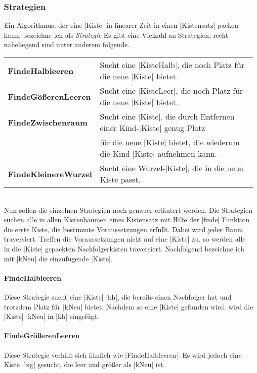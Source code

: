 \subsubsection{Strategien}
\label{strats}
 Ein Algorithmus, der eine |Kiste| in linearer Zeit in einen |Kistensatz| packen kann, bezeichne ich als \emph{Strategie}
 Es gibt eine Vielzahl an Strategien, recht naheliegend sind unter anderem folgende.\\

\begin{tabular}{ll}
 \textbf{FindeHalbleeren}    & Sucht eine |KisteHalb|, die noch Platz für die neue |Kiste| bietet. \\
 \textbf{FindeGößerenLeeren} & Sucht eine |KisteLeer|, die noch Platz für die neue |Kiste| bietet. \\
 \textbf{FindeZwischenraum}  & Sucht eine |Kiste|, die durch Entfernen einer Kind-|Kiste| genug Platz \\
                             & \hfill für die neue |Kiste| bietet, die wiederum die Kind-|Kiste| aufnehmen kann. \\
 \textbf{FindeKleinereWurzel}& Sucht eine Wurzel-|Kiste|, die in die neue Kiste passt.      \\
\end{tabular}\\

 Nun sollen die einzelnen Strategien noch genauer erläutert werden.
 Die Strategien suchen alle in allen Kistenbäumen eines Kistensatz mit Hilfe der |finde| Funktion die erste Kiste,
  die bestimmte Voraussetzungen erfüllt.
 Dabei wird jeder Baum traversiert. Treffen die Voraussetzungen nicht auf eine |Kiste| zu,
  so werden alle in die |Kiste| gepackten Nachfolgerkisten traversiert.
 Nachfolgend bezeichne ich mit |kNeu| die einzufügende |Kiste|.
\paragraph{FindeHalbleeren}
 Diese Strategie sucht eine |Kiste| |kh|, die bereits einen Nachfolger hat und trotzdem Platz für |kNeu| bietet.
 Nachdem so eine |Kiste| gefunden wird, wird die |Kiste| |kNeu| in |kh| eingefügt.
\paragraph{FindeGrößerenLeeren}
 Diese Strategie verhält sich ähnlich wie |FindeHalbleeren|. Es wird jedoch eine Kiste |big| gesucht, die leer und größer als |kNeu| ist.
